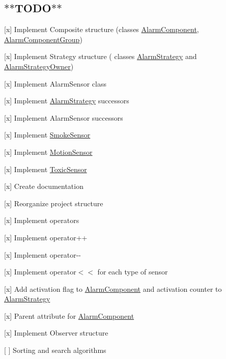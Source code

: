 \subsection*{$\ast$$\ast$\+T\+O\+D\+O$\ast$$\ast$}


\begin{DoxyItemize}
\item \mbox{[}x\mbox{]} Implement Composite structure (classes \hyperlink{classAlarmComponent}{Alarm\+Component}, \hyperlink{classAlarmComponentGroup}{Alarm\+Component\+Group})
\item \mbox{[}x\mbox{]} Implement Strategy structure ( classes \hyperlink{classAlarmStrategy}{Alarm\+Strategy} and \hyperlink{classAlarmStrategyOwner}{Alarm\+Strategy\+Owner})
\item \mbox{[}x\mbox{]} Implement Alarm\+Sensor class
\item \mbox{[}x\mbox{]} Implement \hyperlink{classAlarmStrategy}{Alarm\+Strategy} successors
\item \mbox{[}x\mbox{]} Implement Alarm\+Sensor successors
\begin{DoxyItemize}
\item \mbox{[}x\mbox{]} Implement \hyperlink{classSmokeSensor}{Smoke\+Sensor}
\item \mbox{[}x\mbox{]} Implement \hyperlink{classMotionSensor}{Motion\+Sensor}
\item \mbox{[}x\mbox{]} Implement \hyperlink{classToxicSensor}{Toxic\+Sensor}
\end{DoxyItemize}
\item \mbox{[}x\mbox{]} Create documentation
\item \mbox{[}x\mbox{]} Reorganize project structure
\item \mbox{[}x\mbox{]} Implement operators
\begin{DoxyItemize}
\item \mbox{[}x\mbox{]} Implement operator++
\item \mbox{[}x\mbox{]} Implement operator-\/-\/
\item \mbox{[}x\mbox{]} Implement operator$<$$<$ for each type of sensor
\end{DoxyItemize}
\item \mbox{[}x\mbox{]} Add activation flag to \hyperlink{classAlarmComponent}{Alarm\+Component} and activation counter to \hyperlink{classAlarmStrategy}{Alarm\+Strategy}
\item \mbox{[}x\mbox{]} Parent attribute for \hyperlink{classAlarmComponent}{Alarm\+Component}
\item \mbox{[}x\mbox{]} Implement Observer structure
\item \mbox{[} \mbox{]} Sorting and search algorithms 
\end{DoxyItemize}